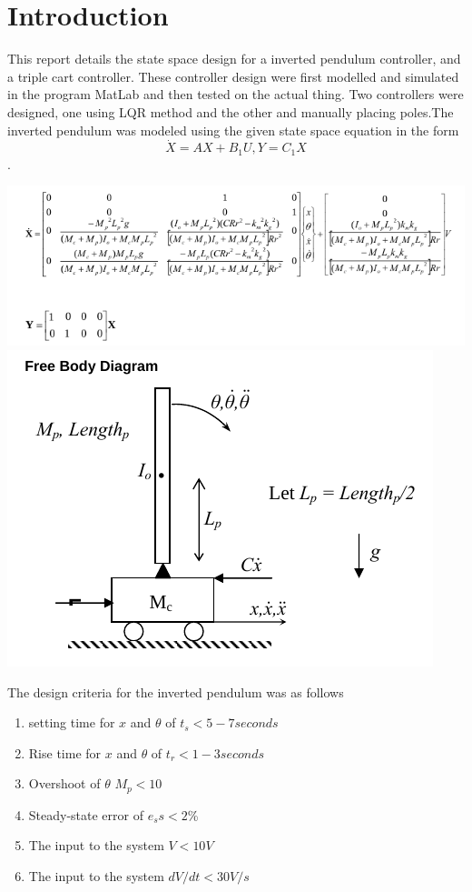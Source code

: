 \documentclass[a4paper,12pt]{article}
\begin{document}
\section{Introduction}

This report details the state space design for a inverted pendulum controller, and a triple cart controller. These controller design were first modelled and simulated in the program MatLab and then tested on the actual thing. Two controllers were designed, one using LQR method and the other and manually placing poles.The inverted pendulum was modeled using the given state space equation in the form $$\dot{X}=AX+B_1U,Y=C_1X$$.

\begin{center}
\includegraphics[scale=0.4]{iP_matrix.png}
\includegraphics[scale=0.3]{iP_diagram.png}\\
\end{center}
\noindent
The design criteria for the inverted pendulum was as follows
\begin{enumerate}
\item setting time for $x$ and $\theta$ of $t_s < 5-7 seconds$
\item Rise time for $x$ and $\theta$ of $t_r < 1-3 seconds$
\item Overshoot of $\theta$ $M_p < 10$
\item Steady-state error of $e_ss < 2$\%
\item The input to the system $V < 10V$
\item The input to the system $dV/dt < 30 V/s$
\end{enumerate}
\end{document}

